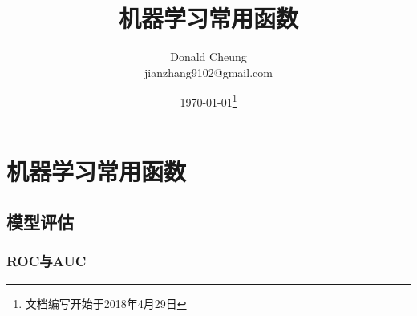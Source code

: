 \ifx\mlnotes\undefined
    \providecommand{\notesroot}{../..}
    \providecommand{\funcroot}{.}

    \title{机器学习常用函数}
    \author{Donald Cheung\\jianzhang9102@gmail.com}
    \date{\today\footnote{文档编写开始于2018年4月29日}}

    
\else
    \providecommand{\funcroot}{\mlroot/function}
\fi

\chapter{机器学习常用函数}

\section{模型评估}

\subsection{ROC与AUC}

\ifx\mlnotes\undefined
    
\fi
